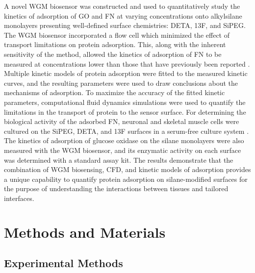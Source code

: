 A novel WGM biosensor was constructed and used to quantitatively study
the kinetics of adsorption of GO and FN at varying concentrations
onto alkylsilane monolayers presenting well-defined surface chemistries:
DETA, 13F, and SiPEG. The WGM biosensor incorporated a flow cell which
minimized the effect of transport limitations on protein adsorption.
This, along with the inherent sensitivity of the method, allowed the
kinetics of adsorption of FN to be measured at concentrations lower
than those that have previously been reported \cite{Michael2003}.
Multiple kinetic models of protein adsorption were fitted to the measured
kinetic curves, and the resulting parameters were used to draw conclusions
about the mechanisms of adsorption. To maximize the accuracy of the
fitted kinetic parameters, computational fluid dynamics simulations
were used to quantify the limitations in the transport of protein
to the sensor surface. For determining the biological activity of
the adsorbed FN, neuronal and skeletal muscle cells were cultured
on the SiPEG, DETA, and 13F surfaces in a serum-free culture system
\cite{Brewer1995,Das2007}. The kinetics of adsorption of glucose
oxidase on the silane monolayers were also measured with the WGM biosensor,
and its enzymatic activity on each surface was determined with a standard
assay kit. The results demonstrate that the combination of WGM biosensing,
CFD, and kinetic models of adsorption provides a unique capability
to quantify protein adsorption on silane-modified surfaces for the
purpose of understanding the interactions between tissues and tailored
interfaces.


\section{Methods and Materials}


\subsection{Experimental Methods}

